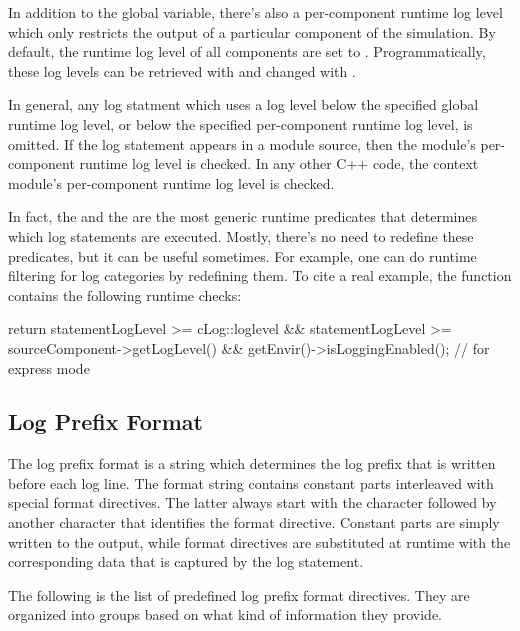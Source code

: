 In addition to the global variable, there's also a per-component runtime log
level which only restricts the output of a particular component of the
simulation. By default, the runtime log level of all components are set to
. Programmatically, these log levels can be retrieved
with  and changed with
.

In general, any log statment which uses a log level below the specified global
runtime log level, or below the specified per-component runtime log level, is
omitted. If the log statement appears in a module source, then the module's
per-component runtime log level is checked. In any other C++ code, the context
module's per-component runtime log level is checked.

In fact, the  and the 
are the most generic runtime predicates that determines which log statements are
executed. Mostly, there's no need to redefine these predicates, but it can be
useful sometimes. For example, one can do runtime filtering for log categories
by redefining them. To cite a real example, the  function
contains the following runtime checks:

\begin{cpp}
return statementLogLevel >= cLog::loglevel &&
       statementLogLevel >= sourceComponent->getLogLevel() &&
       getEnvir()->isLoggingEnabled(); // for express mode
\end{cpp}

\subsection{Log Prefix Format}
\label{sec:config-sim:log-prefix-format}

The log prefix format is a string which determines the log prefix that is written
before each log line. The format string contains constant parts interleaved with
special format directives. The latter always start with the \ttt{\%} character
followed by another character that identifies the format directive. Constant
parts are simply written to the output, while format directives are substituted
at runtime with the corresponding data that is captured by the log statement.

The following is the list of predefined log prefix format directives. They are
organized into groups based on what kind of information they provide.

